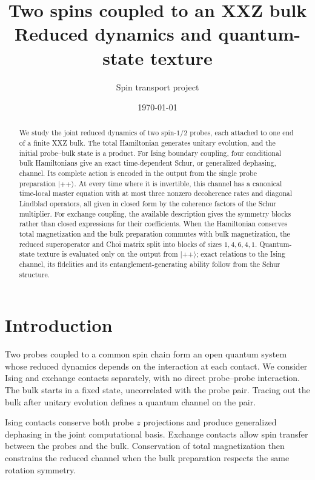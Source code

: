 \documentclass[11pt,a4paper]{article}
\title{Two spins coupled to an XXZ bulk\\[3pt]
\large Reduced dynamics and quantum-state texture}
\author{Spin transport project}
\date{\today}
\newcommand{\ket}[1]{\lvert #1\rangle}
\begin{document}
\maketitle
\begin{abstract}
We study the joint reduced dynamics of two spin-$1/2$ probes,
each attached to one end of a finite XXZ bulk. The total Hamiltonian generates
unitary evolution, and the initial probe--bulk state is a product. For Ising
boundary coupling, four conditional bulk Hamiltonians give an exact
time-dependent Schur, or generalized dephasing, channel. Its complete action
is encoded in the output from the single probe preparation $\ket{++}$.
At every time where it is invertible, this channel has a canonical
time-local master equation with at most three nonzero decoherence rates
and diagonal Lindblad operators, all given in closed form by the
coherence factors of the Schur multiplier.
For exchange coupling, the available description gives the symmetry
blocks rather than closed expressions for their coefficients. When the Hamiltonian conserves total
magnetization and the bulk preparation commutes with bulk magnetization,
the reduced superoperator and Choi matrix split into blocks of sizes
$1,4,6,4,1$. Quantum-state texture is evaluated only on the output from
$\ket{++}$; exact relations to the Ising channel, its fidelities and its
entanglement-generating ability follow from the Schur structure.
\end{abstract}
\tableofcontents

\section{Introduction}

Two probes coupled to a common spin chain form an open quantum system
whose reduced dynamics depends on the interaction at each contact.
We consider Ising and exchange contacts separately, with no direct
probe--probe interaction. The bulk starts in a fixed state, uncorrelated
with the probe pair. Tracing out the bulk after unitary evolution defines
a quantum channel on the pair.

Ising contacts conserve both probe $z$ projections and produce generalized
dephasing in the joint computational basis. Exchange contacts allow spin
transfer between the probes and the bulk. Conservation of total
magnetization then constrains the reduced channel when the bulk
preparation respects the same rotation symmetry.
\end{document}
